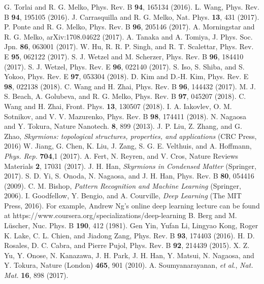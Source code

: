 \documentclass[reprint,amsmath,amssymb,aps,showpacs,superscriptaddress,prb]{revtex4-1}
\begin{document}
\begin{thebibliography}{99}

 G. Torlai and R. G. Melko, Phys. Rev. B {\bf 94}, 165134 (2016).
 L. Wang, Phys. Rev. B {\bf 94}, 195105 (2016).
 J. Carrasquilla and R. G. Melko, Nat. Phys. {\bf 13}, 431 (2017).
 P. Ponte and R. G. Melko, Phys. Rev. B {\bf 96}, 205146 (2017).
 A. Morningstar and R. G. Melko, arXiv:1708.04622 (2017).
 A. Tanaka and A. Tomiya, J. Phys. Soc. Jpn. {\bf 86}, 063001 (2017).
 W. Hu, R. R. P. Singh, and R. T. Scalettar, Phys. Rev. E {\bf 95}, 062122 (2017).
 S. J. Wetzel and M. Scherzer, Phys. Rev. B {\bf 96}, 184410 (2017).
 S. J. Wetzel, Phys. Rev. E {\bf 96}, 022140 (2017).
 S. Iso, S. Shiba, and S. Yokoo, Phys. Rev. E {\bf 97}, 053304 (2018).
 D. Kim and D.-H. Kim, Phys. Rev. E {\bf 98}, 022138 (2018).
 C. Wang and H. Zhai, Phys. Rev. B {\bf 96}, 144432 (2017).
 M. J. S. Beach, A. Golubeva, and R. G. Melko, Phys. Rev. B {\bf 97}, 045207 (2018).
 C. Wang and H. Zhai, Front. Phys. {\bf 13}, 130507 (2018).
 I. A. Iakovlev, O. M. Sotnikov, and V. V. Mazurenko, Phys. Rev. B {\bf 98}, 174411 (2018).
 N. Nagaosa and Y. Tokura, Nature Nanotech. {\bf 8}, 899 (2013).
 J. P. Liu, Z. Zhang, and G. Zhao, {\it Skyrmions: topological structures, properties, and applications} (CRC Press, 2016)
 W. Jiang, G. Chen, K. Liu, J. Zang, S. G. E. Velthuis, and A. Hoffmann, {\it Phys. Rep.} {\bf 704},1 (2017).
 A. Fert, N. Reyren, and V. Cros, Nature Reviews Materials {\bf 2}, 17031 (2017).
 J. H. Han, {\it Skyrmions in Condensed Matter}  (Springer, 2017).
 S. D. Yi, S. Onoda, N. Nagaosa, and J. H. Han, Phys. Rev. B {\bf 80}, 054416 (2009).
 C. M. Bishop, {\it Pattern Recognition and Machine Learning} (Springer, 2006).
 I. Goodfellow, Y. Bengio, and A. Courville, {\it Deep Learning} (The MIT Press, 2016).
 For example, Andrew Ng's online deep learning lecture can be found at https://www.coursera.org/specializations/deep-learning
 B. Berg and M. L\"{u}scher, Nuc. Phys. B {\bf 190}, 412 (1981).
 Gen Yin, Yufan Li, Lingyao Kong, Roger K. Lake, C. L. Chien, and Jiadong Zang, Phys. Rev. B {\bf 93}, 174403 (2016).
 H. D. Rosales, D. C. Cabra, and Pierre Pujol, Phys. Rev. B {\bf 92}, 214439 (2015).
 X. Z. Yu, Y. Onose, N. Kanazawa, J. H. Park, J. H. Han, Y. Matsui, N. Nagaosa, and Y. Tokura, Nature (London) {\bf 465}, 901 (2010).
 A. Soumyanarayanan, {\it et al}., {\it Nat. Mat.} {\bf 16}, 898 (2017).

\end{thebibliography}

%
%
\end{document}
